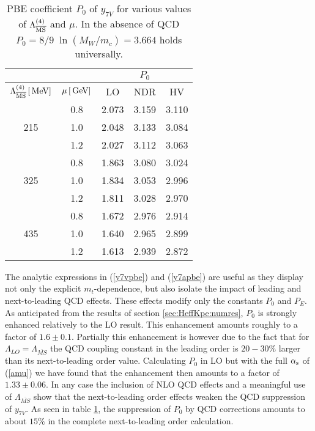 \begin{table}[htb]
\caption[]{PBE coefficient $P_0$ of $y_{7V}$ for various values of
$\Lambda_{\overline{\rm MS}}^{(4)}$ and $\mu$. In the absence of QCD $P_0=8/9\;\ln(M_W/m_c)
= 3.664$ holds universally.
\label{tab:P0klpee}}
\begin{center}
\begin{tabular}{|c|c||c|c|c|}
\multicolumn{2}{|c||}{}     &
\multicolumn{3}{c|}{$P_0$} \\
\hline
$\Lambda_{\overline{\rm MS}}^{(4)}\,[\, {\rm MeV}]$ & $\mu\,[\, {\rm GeV}]$ & {\rm LO} & {\rm NDR} & {\rm HV} \\
\hline
    & 0.8 & 2.073 &  3.159 &  3.110 \\
215 & 1.0 & 2.048 &  3.133 &  3.084 \\
    & 1.2 & 2.027 &  3.112 &  3.063 \\
\hline
    & 0.8 & 1.863 &  3.080 &  3.024 \\
325 & 1.0 & 1.834 &  3.053 &  2.996 \\
    & 1.2 & 1.811 &  3.028 &  2.970 \\
\hline
    & 0.8 & 1.672 &  2.976 &  2.914 \\
435 & 1.0 & 1.640 &  2.965 &  2.899 \\
    & 1.2 & 1.613 &  2.939 &  2.872
\end{tabular}
\end{center}
\end{table}

The analytic expressions in (\ref{y7vpbe}) and (\ref{y7apbe}) are
useful as they display not only the explicit $m_t$-dependence, but also
isolate the impact of leading and next-to-leading QCD effects. These
effects modify only the constants $P_0$ and $P_E$. As anticipated from
the results of section \ref{sec:HeffKpe:numres}, $P_0$ is strongly
enhanced relatively to the LO result. This enhancement amounts roughly
to a factor of $1.6\pm 0.1$. Partially this enhancement is however due
to the fact that for $\Lambda_{LO}=\Lambda_{\overline{MS}}$ the QCD
coupling constant in the leading order is $20-30\%$ larger than its
next-to-leading order value. Calculating $P_0$ in LO but with the full
$\alpha_{\rm s}$ of (\ref{amu}) we have found that the enhancement then amounts to
a factor of $1.33\pm 0.06$. In any case the inclusion of NLO QCD
effects and a meaningful use of $\Lambda_{\overline{MS}}$ show that the
next-to-leading order effects weaken the QCD suppression of $y_{7V}$.
As seen in table \ref{tab:P0klpee}, the suppression of $P_0$ by QCD
corrections amounts to about $15\%$ in the complete next-to-leading
order calculation.

